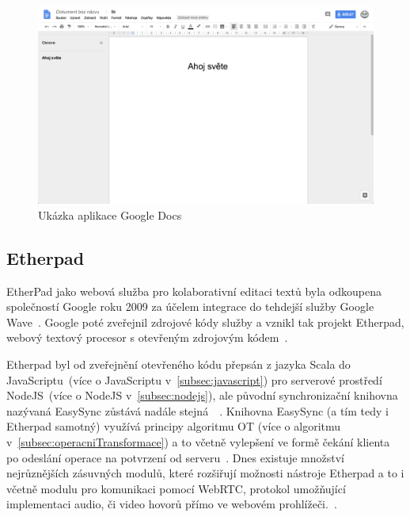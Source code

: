 \begin{figure}[ht]
    \centering
    \includegraphics[width=\textwidth]{partials/analyza/googleDocs}
    \caption{Ukázka aplikace Google Docs}\label{fig:googleDocs}
\end{figure}

\subsection{Etherpad}\label{subsec:etherpad}

EtherPad jako webová služba pro kolaborativní editaci textů byla odkoupena společností Google roku 2009 za účelem integrace do tehdejší služby Google Wave~\cite{etherpad:acquired}.
Google poté zveřejnil zdrojové kódy služby a vznikl tak projekt Etherpad, webový textový procesor s otevřeným zdrojovým kódem~\cite{etherpad:openSource}.

Etherpad byl od zveřejnění otevřeného kódu přepsán z jazyka Scala do JavaScriptu~(více o JavaScriptu v~\ref{subsec:javascript}) pro serverové prostředí NodeJS~(více o NodeJS v~\ref{subsec:nodejs}), ale původní synchronizační knihovna nazývaná EasySync zůstává nadále stejná~\cite{etherpad:newgithub}~\cite{etherpad:easySync}.
Knihovna EasySync (a tím tedy i Etherpad samotný) využívá principy algoritmu \gls{OT} (více o algoritmu v~\ref{subsec:operacniTransformace}) a to včetně vylepšení ve formě čekání klienta po odeslání operace na potvrzení od serveru~\cite{etherpad:easySync}.
Dnes existuje množství nejrůznějších zásuvných modulů, které rozšiřují možnosti nástroje Etherpad a to i včetně modulu pro komunikaci pomocí \gls{WebRTC}, protokol umožňující implementaci audio, či video hovorů přímo ve webovém prohlížeči.~\cite{etherpad:plugins}.

